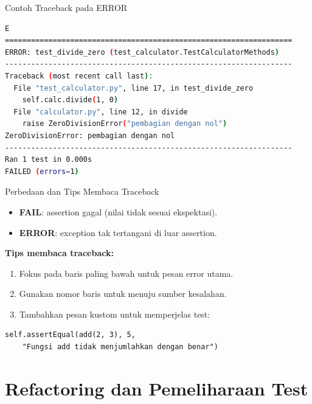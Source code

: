 \documentclass[aspectratio=169, table]{beamer}
\begin{document}
\begin{frame}[fragile]{Contoh Traceback pada ERROR}
\vspace*{20pt}
\begin{lstlisting}[language=bash]
E
==================================================================
ERROR: test_divide_zero (test_calculator.TestCalculatorMethods)
------------------------------------------------------------------
Traceback (most recent call last):
  File "test_calculator.py", line 17, in test_divide_zero
    self.calc.divide(1, 0)
  File "calculator.py", line 12, in divide
    raise ZeroDivisionError("pembagian dengan nol")
ZeroDivisionError: pembagian dengan nol
------------------------------------------------------------------
Ran 1 test in 0.000s
FAILED (errors=1)
\end{lstlisting}
\end{frame}

\begin{frame}[fragile]{Perbedaan dan Tips Membaca Traceback}
\vspace*{20pt}
\begin{itemize}
  \item \textbf{FAIL}: assertion gagal (nilai tidak sesuai ekspektasi).
  \item \textbf{ERROR}: exception tak tertangani di luar assertion.
\end{itemize}

\textbf{Tips membaca traceback:}
\begin{enumerate}
  \item Fokus pada baris paling bawah untuk pesan error utama.
  \item Gunakan nomor baris untuk menuju sumber kesalahan.
  \item Tambahkan pesan kustom untuk memperjelas test:
\end{enumerate}

\begin{lstlisting}[style=PythonStyle]
self.assertEqual(add(2, 3), 5, 
    "Fungsi add tidak menjumlahkan dengan benar")
\end{lstlisting}
\end{frame}


\section{Refactoring dan Pemeliharaan Test}
\end{document}
